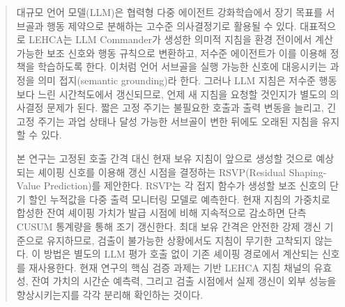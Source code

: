 \begin{abstract}
대규모 언어 모델(LLM)은 협력형 다중 에이전트 강화학습에서 장기 목표를 서브골과
행동 제약으로 분해하는 고수준 의사결정기로 활용될 수 있다. 대표적으로 LEHCA는
LLM Commander가 생성한 의미적 지침을 환경 전이에서 계산 가능한 보조 신호와
행동 규칙으로 변환하고, 저수준 에이전트가 이를 이용해 정책을 학습하도록 한다.
이처럼 언어 서브골을 실행 가능한 신호에 대응시키는 과정을 의미 접지(semantic
grounding)라 한다. 그러나 LLM 지침은
저수준 행동보다 느린 시간척도에서 갱신되므로, 언제 새 지침을 요청할 것인지가 별도의
의사결정 문제가 된다. 짧은 고정 주기는 불필요한 호출과 출력 변동을 늘리고, 긴 고정
주기는 과업 상태나 달성 가능한 서브골이 변한 뒤에도 오래된 지침을 유지할 수 있다.

본 연구는 고정된 호출 간격 대신 현재 보유 지침이 앞으로 생성할 것으로 예상되는
셰이핑 신호를 이용해 갱신 시점을 결정하는 RSVP(Residual Shaping-Value Prediction)를
제안한다. RSVP는 각 접지 함수가 생성할 보조 신호의 단기 할인 누적값을 다중 출력
모니터링 모델로 예측한다. 현재 지침의 가중치로 합성한 잔여 셰이핑 가치가 발급 시점에
비해 지속적으로 감소하면 단측 CUSUM 통계량을 통해 조기 갱신한다. 최대 보유 간격은
안전한 강제 갱신 기준으로 유지하므로, 검출이 불가능한 상황에서도 지침이 무기한
고착되지 않는다. 이 방법은
별도의 LLM 평가 호출 없이 기존 셰이핑 경로에서 계산되는 신호를 재사용한다.
현재 연구의 핵심 검증 과제는 기반 LEHCA 지침 채널의 유효성, 잔여 가치의 시간순
예측력, 그리고 검출 시점에서 실제 갱신이 외부 성능을 향상시키는지를 각각 분리해
확인하는 것이다.
\end{abstract}
